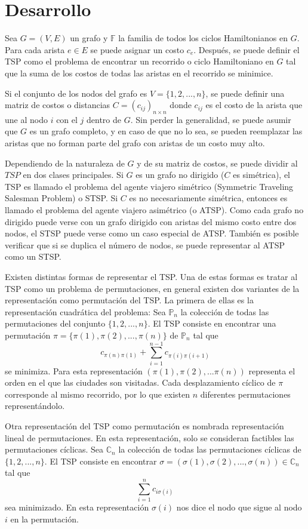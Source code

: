 \section*{Desarrollo}
Sea $G=(V,E)$ un grafo y $\mathbb{F}$ la familia de todos los ciclos Hamiltonianos en $G$. Para cada arista $e\in E$ se puede asignar un costo  $c_e$. Después, se puede definir el TSP como el problema de encontrar un recorrido o ciclo Hamiltoniano en $G$ tal que la suma de los costos de todas las aristas en el recorrido se minimice.
\par Si el conjunto de los nodos del grafo es $V=\{1, 2, ..., n\}$, se puede definir una matriz de costos o distancias $C =(c_{ij})_{n\times n}$ donde $c_{ij}$ es el costo de la arista que une al nodo $i$ con el $j$ dentro de $G$. Sin perder la generalidad, se puede asumir que $G$ es un grafo completo, y en caso de que no lo sea, se pueden reemplazar las aristas que no forman parte del grafo con aristas de un costo muy alto.
\par Dependiendo de la naturaleza de $G$ y de su matriz de costos, se puede dividir al $TSP$ en dos clases principales. Si $G$ es un grafo no dirigido ($C$ es simétrica), el TSP es llamado el problema del agente viajero simétrico (Symmetric Traveling Salesman Problem) o STSP. Si $C$ es no necesariamente simétrica, entonces es llamado el problema del agente viajero asimétrico (o ATSP). Como cada grafo no dirigido puede verse con un grafo dirigido con aristas del mismo costo entre dos nodos, el STSP puede verse como un caso especial de ATSP. También es posible verificar que si se duplica el número de nodos, se puede representar al ATSP como un STSP.
\par Existen distintas formas de representar el TSP. Una de estas formas es tratar al TSP como un problema de permutaciones, en general existen dos variantes de la representación como permutación del TSP. La primera de ellas es la representación cuadrática del problema: Sea $\mathbb{P}_n$  la colección de todas las permutaciones del conjunto $\{1, 2,..., n\}$. El TSP consiste en encontrar una permutación $\pi = \{\pi(1), \pi(2), ..., \pi(n)\}$ de $\mathbb{P}_n$ tal que
$$
c_{\pi(n)\pi(1)} + \sum\limits_{i=1}^{n-1}c_{\pi(i)\pi(i+1)}
$$
se minimiza. Para esta representación $(\pi(1), \pi(2), ...\pi(n))$ representa el orden en el que las ciudades son visitadas. Cada desplazamiento cíclico de $\pi$ corresponde al mismo recorrido, por lo que existen $n$ diferentes permutaciones representándolo.
\par Otra representación del TSP como permutación es nombrada representación lineal de permutaciones. En esta representación, solo se consideran factibles las permutaciones cíclicas. Sea $\mathbb{C}_n$ la colección de todas las permutaciones cíclicas de $\{1, 2, ..., n\}$. El TSP consiste en encontrar $\sigma = (\sigma(1), \sigma(2), ..., \sigma(n))\in\mathbb{C}_n$ tal que
$$
	\sum\limits_{i=1}^{n}c_{i\sigma(i)}
$$
sea minimizado. En esta representación $\sigma(i)$ nos dice el nodo que sigue al nodo $i$ en la permutación.
